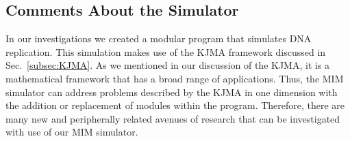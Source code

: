 		
		\subsection{Comments About the Simulator}
		
		In our investigations we created a modular program that simulates DNA replication.
		This simulation makes use of the KJMA framework discussed in Sec.~\ref{subsec:KJMA}.
		As we mentioned in our discussion of the KJMA, it is a mathematical framework that has a broad range of applications.
		Thus, the MIM simulator can address problems described by the KJMA in one dimension with the addition or replacement of modules within the program.
		Therefore, there are many new and peripherally related avenues of research that can be investigated with use of our MIM simulator.
		
